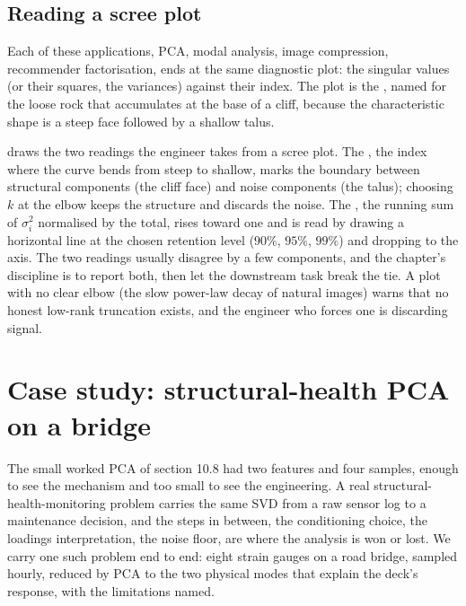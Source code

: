 \subsection{Reading a scree plot}

Each of these applications, PCA, modal analysis, image compression,
recommender factorisation, ends at the same diagnostic plot: the
singular values (or their squares, the variances) against their
index. The plot is the , named for the loose
rock that accumulates at the base of a cliff, because the
characteristic shape is a steep face followed by a shallow talus.



 draws the two readings the
engineer takes from a scree plot. The , the index
where the curve bends from steep to shallow, marks the boundary
between structural components (the cliff face) and noise components
(the talus); choosing $k$ at the elbow keeps the structure and
discards the noise. The , the running sum of $\sigma_{i}^{2}$ normalised by the total,
rises toward one and is read by drawing a horizontal line at the
chosen retention level ($90\%$, $95\%$, $99\%$) and dropping to the
axis. The two readings usually disagree by a few components, and the
chapter's discipline is to report both, then let the downstream task
break the tie. A plot with no clear elbow (the slow power-law decay
of natural images) warns that no honest low-rank truncation exists,
and the engineer who forces one is discarding signal.

\section{Case study: structural-health PCA on a bridge}
\label{sec:vol02:ch10:bridge-casestudy}

The small worked PCA of section 10.8 had two features and four samples,
enough to see the mechanism and too small to see the engineering. A real
structural-health-monitoring problem carries the same SVD from a raw
sensor log to a maintenance decision, and the steps in between, the
conditioning choice, the loadings interpretation, the noise floor, are
where the analysis is won or lost. We carry one such problem end to end:
eight strain gauges on a road bridge, sampled hourly, reduced by PCA to
the two physical modes that explain the deck's response, with the
limitations named.

